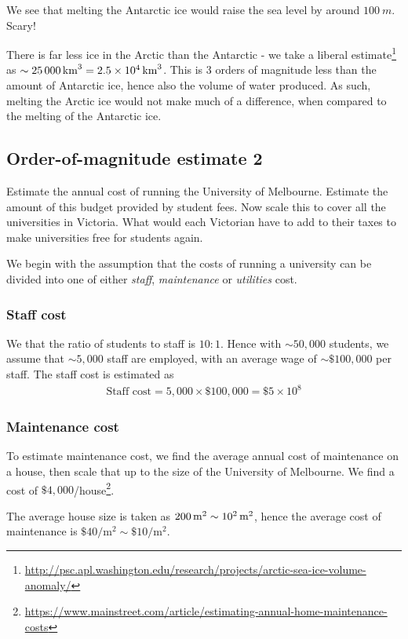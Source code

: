 \documentclass[a4paper]{article} %
\begin{document}
We see that melting the Antarctic ice would raise the sea level by around $\SI{100}{m}$. Scary!

There is far less ice in the Arctic than the Antarctic - we take a liberal estimate\footnote{\url{http://psc.apl.washington.edu/research/projects/arctic-sea-ice-volume-anomaly/}} as $\sim \SI{25000}{km^3}=\SI{2.5d4}{km^3}$. This is 3 orders of magnitude less than the amount of Antarctic ice, hence also the volume of water produced. As such, melting the Arctic ice would not make much of a difference, when compared to the melting of the Antarctic ice.

\subsection{Order-of-magnitude estimate 2}
\begin{framed}
Estimate the annual cost of running the University of Melbourne. Estimate the amount of this budget provided by student fees. Now scale this to cover all the universities in Victoria. What would each Victorian have to add to their taxes to make universities free for students again.
\end{framed}

We begin with the assumption that the costs of running a university can be divided into one of either \emph{staff}, \emph{maintenance} or \emph{utilities} cost.

\subsubsection{Staff cost}
We that the ratio of students to staff is $10:1$. Hence with $\sim 50,000$ students, we assume that $\sim 5,000$ staff are employed, with an average wage of $\sim \$100,000$ per staff. The staff cost is estimated as
\begin{align}
\text{Staff cost}=5,000\times\$100,000=\$5\times 10^8
\end{align} 

\subsubsection{Maintenance cost}
To estimate maintenance cost, we find the average annual cost of maintenance on a house, then scale that up to the size of the University of Melbourne. We find a cost of $\$4,000$/house\footnote{\url{https://www.mainstreet.com/article/estimating-annual-home-maintenance-costs}}.

The average house size is taken as $\SI{200}{m^2}\sim \SI{d2}{m^2}$, hence the average cost of maintenance is $\$40/\text{m}^2\sim \$10/\text{m}^2$.
\end{document}
